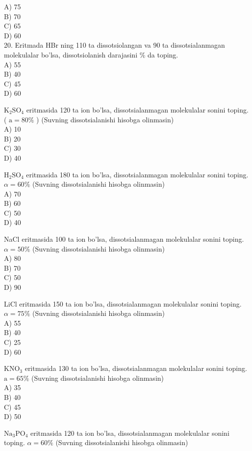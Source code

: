 A) 75\\
B) 70\\
C) 65\\
D) 60\\
20. Eritmada HBr ning 110 ta dissotsiolangan va 90 ta dissotsialanmagan molekulalar bo'lsa, dissotsiolanish darajasini \% da toping.\\
A) 55\\
B) 40\\
C) 45\\
D) 60
  \item $\mathrm{K}_{2} \mathrm{SO}_{4}$ eritmasida 120 ta ion bo'lsa, dissotsialanmagan molekulalar sonini toping. ( $\mathrm{a}=80 \%$ ) (Suvning dissotsialanishi hisobga olinmasin)\\
A) 10\\
B) 20\\
C) 30\\
D) 40
  \item $\mathrm{H}_{2} \mathrm{SO}_{4}$ eritmasida 180 ta ion bo'lsa, dissotsialanmagan molekulalar sonini toping. $\alpha=60 \%$ (Suvning dissotsialanishi hisobga olinmasin)\\
A) 70\\
B) 60\\
C) 50\\
D) 40
  \item NaCl eritmasida 100 ta ion bo'lsa, dissotsialanmagan molekulalar sonini toping. $\alpha=50 \%$ (Suvning dissotsialanishi hisobga olinmasin)\\
A) 80\\
B) 70\\
C) 50\\
D) 90
  \item LiCl eritmasida 150 ta ion bo'lsa, dissotsialanmagan molekulalar sonini toping. $\alpha=75 \%$ (Suvning dissotsialanishi hisobga olinmasin)\\
A) 55\\
B) 40\\
C) 25\\
D) 60
  \item $\mathrm{KNO}_{3}$ eritmasida 130 ta ion bo'lsa, dissotsialanmagan molekulalar sonini toping. $\mathrm{a}=65 \%$ (Suvning dissotsialanishi hisobga olinmasin)\\
A) 35\\
B) 40\\
C) 45\\
D) 50
  \item $\mathrm{Na}_{3} \mathrm{PO}_{4}$ eritmasida 120 ta ion bo'lsa, dissotsialanmagan molekulalar sonini toping. $\alpha=60 \%$ (Suvning dissotsialanishi hisobga olinmasin)\\
